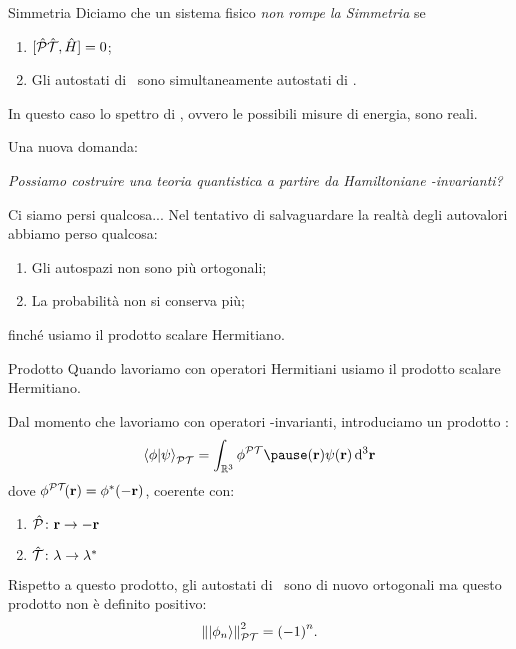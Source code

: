 \begin{frame}{Simmetria \PT}
    Diciamo che un sistema fisico \emph{non rompe la Simmetria \PT} se
    \begin{enumerate}[label=\mybullet]
        \pause
        \item $\comm*{\hPT}{\hH}\! = 0$;
        \pause
        \item Gli autostati di \hH\ sono simultaneamente autostati di \hPT.
    \end{enumerate}
    \pause
    In questo caso lo spettro di \hH, ovvero le possibili misure di energia, sono reali.
\end{frame}

\begin{frame}
    Una nuova domanda:
    \begin{center}
        {\it Possiamo costruire una teoria quantistica a partire da Hamiltoniane \PT-invarianti?}
    \end{center}
\end{frame}

\begin{frame}{Ci siamo persi qualcosa...}
    Nel tentativo di salvaguardare la realtà degli autovalori abbiamo perso qualcosa:
    \begin{enumerate}
        \pause
        \item[\ding{55}] Gli autospazi non sono più ortogonali;
        \pause
        \item[\ding{55}] La probabilità non si conserva più;
    \end{enumerate}
    \pause
    finché usiamo il prodotto scalare Hermitiano.
\end{frame}

\begin{frame}{Prodotto \PT}
    Quando lavoriamo con operatori Hermitiani usiamo il prodotto scalare Hermitiano.
    
    \pause
    Dal momento che lavoriamo con operatori \PT-invarianti, introduciamo un prodotto \PT :
    \begin{equation*}
        \braket{\phi}{\psi}_{\PT} = \int\nolimits_{\bbR^3}\phi^{\PT}\pause\pqty{\vb{r}}\psi\pqty{\vb{r}} \dd[3]{\vb{r}}
    \end{equation*}
    dove $\phi^{\PT}\!\pqty{\vb{r}} = \phi^*\pqty{-\vb{r}}$, \pause coerente con:
    \begin{enumerate}[label=\mybullet]
        \item $\mathcal{\hat{P}}\colon\vb{r}\rightarrow-\vb{r}$
        \item $\mathcal{\hat{T}}\colon\lambda\rightarrow\lambda^*$
    \end{enumerate}
    \pause
    Rispetto a questo prodotto, gli autostati di \hH\ sono di nuovo ortogonali ma questo prodotto non è definito positivo:
    \begin{equation*}
        \norm{\ket{\phi_n}}^2_{\PT} = \pqty{-1}^n
        \myperiod
    \end{equation*}
\end{frame}

